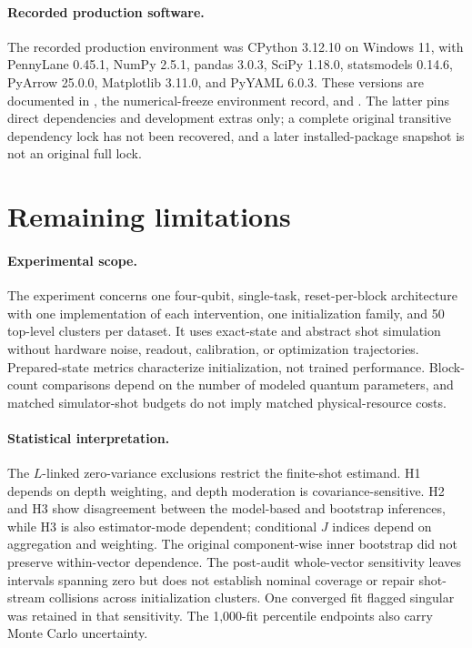 \documentclass[pdflatex,sn-basic,Numbered]{sn-jnl}
\begin{document}
\paragraph{Recorded production software.}
The recorded production environment was CPython 3.12.10 on Windows 11, with PennyLane 0.45.1, NumPy 2.5.1, pandas 3.0.3, SciPy 1.18.0, statsmodels 0.14.6, PyArrow 25.0.0, Matplotlib 3.11.0, and PyYAML 6.0.3. These versions are documented in , the numerical-freeze environment record, and . The latter pins direct dependencies and development extras only; a complete original transitive dependency lock has not been recovered, and a later installed-package snapshot is not an original full lock.

\section{Remaining limitations}

\paragraph{Experimental scope.}
The experiment concerns one four-qubit, single-task, reset-per-block architecture with one implementation of each intervention, one initialization family, and 50 top-level clusters per dataset. It uses exact-state and abstract shot simulation without hardware noise, readout, calibration, or optimization trajectories. Prepared-state metrics characterize initialization, not trained performance. Block-count comparisons depend on the number of modeled quantum parameters, and matched simulator-shot budgets do not imply matched physical-resource costs.

\paragraph{Statistical interpretation.}
The $L$-linked zero-variance exclusions restrict the finite-shot estimand. H1 depends on depth weighting, and depth moderation is covariance-sensitive. H2 and H3 show disagreement between the model-based and bootstrap inferences, while H3 is also estimator-mode dependent; conditional $J$ indices depend on aggregation and weighting. The original component-wise inner bootstrap did not preserve within-vector dependence. The post-audit whole-vector sensitivity leaves intervals spanning zero but does not establish nominal coverage or repair shot-stream collisions across initialization clusters. One converged fit flagged singular was retained in that sensitivity. The 1,000-fit percentile endpoints also carry Monte Carlo uncertainty.
\end{document}
